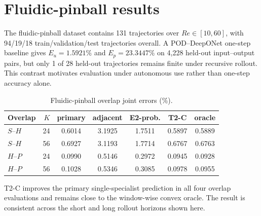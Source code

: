 \section{Fluidic-pinball results}
\label{app:pinball}

The fluidic-pinball dataset contains 131 trajectories over $Re\in[10,60]$, with 94/19/18 train/validation/test trajectories overall. A POD--DeepONet one-step baseline gives $E_u=1.5921\%$ and $E_p=23.3447\%$ on 4,228 held-out input--output pairs, but only 1 of 28 held-out trajectories remains finite under recursive rollout. This contrast motivates evaluation under autonomous use rather than one-step accuracy alone.

\begin{table}[h]
\centering
\caption{Fluidic-pinball overlap joint errors (\%).}
\label{tab:pinball_overlap}
\small
\setlength{\tabcolsep}{3.5pt}
\begin{tabular}{lrccccc}
\toprule
Overlap & $K$ & primary & adjacent & E2-prob. & T2-C & oracle \\
\midrule
$S$--$H$ & 24 & 0.6014 & 3.1925 & 1.7511 & 0.5897 & 0.5889 \\
$S$--$H$ & 56 & 0.6927 & 3.1193 & 1.7714 & 0.6767 & 0.6763 \\
$H$--$P$ & 24 & 0.0990 & 0.5146 & 0.2972 & 0.0945 & 0.0928 \\
$H$--$P$ & 56 & 0.1028 & 0.5346 & 0.3085 & 0.0978 & 0.0955 \\
\bottomrule
\end{tabular}
\end{table}

T2-C improves the primary single-specialist prediction in all four overlap evaluations and remains close to the window-wise convex oracle. The result is consistent across the short and long rollout horizons shown here.
